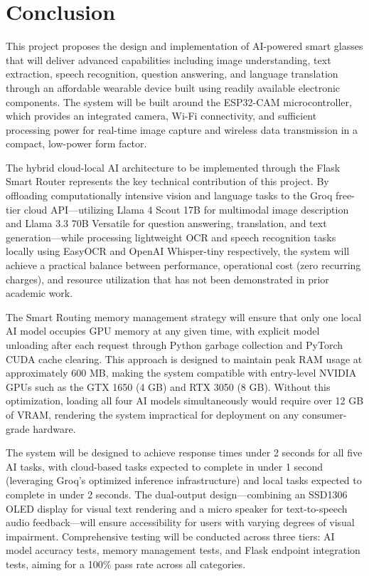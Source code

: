 \chapter{Conclusion}

This project proposes the design and implementation of AI-powered smart glasses that will deliver advanced capabilities including image understanding, text extraction, speech recognition, question answering, and language translation through an affordable wearable device built using readily available electronic components. The system will be built around the ESP32-CAM microcontroller, which provides an integrated camera, Wi-Fi connectivity, and sufficient processing power for real-time image capture and wireless data transmission in a compact, low-power form factor.

The hybrid cloud-local AI architecture to be implemented through the Flask Smart Router represents the key technical contribution of this project. By offloading computationally intensive vision and language tasks to the Groq free-tier cloud API---utilizing Llama 4 Scout 17B for multimodal image description and Llama 3.3 70B Versatile for question answering, translation, and text generation---while processing lightweight OCR and speech recognition tasks locally using EasyOCR and OpenAI Whisper-tiny respectively, the system will achieve a practical balance between performance, operational cost (zero recurring charges), and resource utilization that has not been demonstrated in prior academic work.

The Smart Routing memory management strategy will ensure that only one local AI model occupies GPU memory at any given time, with explicit model unloading after each request through Python garbage collection and PyTorch CUDA cache clearing. This approach is designed to maintain peak RAM usage at approximately 600 MB, making the system compatible with entry-level NVIDIA GPUs such as the GTX 1650 (4 GB) and RTX 3050 (8 GB). Without this optimization, loading all four AI models simultaneously would require over 12 GB of VRAM, rendering the system impractical for deployment on any consumer-grade hardware.

The system will be designed to achieve response times under 2 seconds for all five AI tasks, with cloud-based tasks expected to complete in under 1 second (leveraging Groq's optimized inference infrastructure) and local tasks expected to complete in under 2 seconds. The dual-output design---combining an SSD1306 OLED display for visual text rendering and a micro speaker for text-to-speech audio feedback---will ensure accessibility for users with varying degrees of visual impairment. Comprehensive testing will be conducted across three tiers: AI model accuracy tests, memory management tests, and Flask endpoint integration tests, aiming for a 100\% pass rate across all categories.

